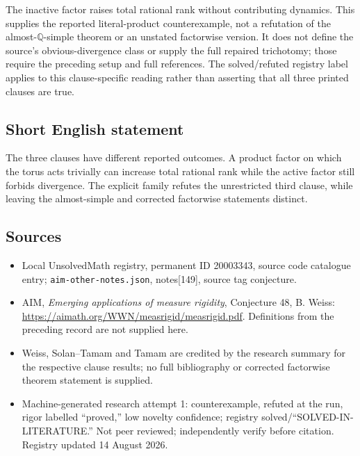 \documentclass[11pt]{article}
\newcommand{\Q}{\mathbb{Q}}
\begin{document}
The inactive factor raises total rational rank without contributing dynamics. This supplies the reported literal-product counterexample, not a refutation of the almost-$\Q$-simple theorem or an unstated factorwise version. It does not define the source's obvious-divergence class or supply the full repaired trichotomy; those require the preceding setup and full references. The solved/refuted registry label applies to this clause-specific reading rather than asserting that all three printed clauses are true.
\subsection{Short English statement}
The three clauses have different reported outcomes. A product factor on which the torus acts trivially can increase total rational rank while the active factor still forbids divergence. The explicit family refutes the unrestricted third clause, while leaving the almost-simple and corrected factorwise statements distinct.
\subsection{Sources}
\begin{itemize}
\item Local UnsolvedMath registry, permanent ID 20003343, source code catalogue entry; \texttt{aim-other-notes.json}, notes[149], source tag conjecture.
\item AIM, \emph{Emerging applications of measure rigidity}, Conjecture 48, B. Weiss: \url{https://aimath.org/WWN/measrigid/measrigid.pdf}. Definitions from the preceding record are not supplied here.
\item Weiss, Solan--Tamam and Tamam are credited by the research summary for the respective clause results; no full bibliography or corrected factorwise theorem statement is supplied.
\item Machine-generated research attempt 1: counterexample, refuted at the run, rigor labelled ``proved,'' low novelty confidence; registry solved/``SOLVED-IN-LITERATURE.'' Not peer reviewed; independently verify before citation. Registry updated 14 August 2026.
\end{itemize}
\end{document}
